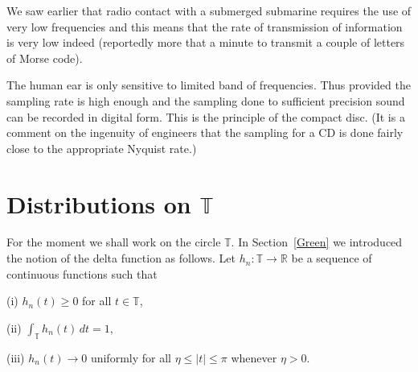 We saw earlier that radio contact with a submerged submarine
requires the use of very low frequencies and this means that
the rate of transmission of information is very low indeed
(reportedly more that a minute to transmit a couple
of letters of Morse code).

The human ear is only sensitive to limited band of frequencies.
Thus provided the sampling rate is high enough and the sampling done
to sufficient precision sound can be recorded in digital form.
This is the principle of the compact disc. (It is a comment
on the ingenuity of engineers that the sampling for a CD
is done fairly close to the appropriate Nyquist rate.)

\section{Distributions on ${\mathbb T}$}
For the moment we shall work
on  the circle ${\mathbb T}$.  In Section~\ref{Green}
we introduced the notion of the delta function as
follows. Let $h_{n}:{\mathbb T}\rightarrow{\mathbb R}$
be a sequence of continuous functions such that

(i) $h_{n}(t)\geq 0$ for all $t\in{\mathbb T}$,

(ii) ${\displaystyle \int_{\mathbb T}h_{n}(t)\,dt=1}$,

(iii) $h_{n}(t)\rightarrow 0$ uniformly for all $\eta\leq |t|\leq \pi$
whenever $\eta>0$.

